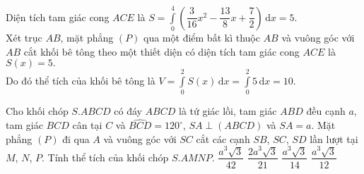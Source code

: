 \begin{ex}
{Diện tích tam giác cong $ACE$ là $S=\displaystyle\int\limits_{0}^{4}\left(\dfrac{3}{16}x^2-\dfrac{13}{8}x+\dfrac{7}{2}\right)\mathrm{\,d}x=5.$\\
Xét trục $AB$, mặt phẳng $(P)$ qua một điểm bất kì thuộc $AB$ và vuông góc với $AB$ cắt khối bê tông theo một thiết diện có diện tích tam giác cong $ACE$ là $S(x)=5.$\\
Do đó thể tích của khối bê tông là $V=\displaystyle\int\limits_{0}^{2}S(x)\mathrm{\,d}x=\displaystyle\int\limits_{0}^{2}5\mathrm{\,d}x=10.$
}
\end{ex}


\begin{ex}%
Cho khối chóp $S.ABCD$ có đáy $ABCD$ là tứ giác lồi, tam giác $ABD$ đều cạnh $a,$ tam giác $BCD$ cân tại $C$ và $\widehat{BCD}=120^\circ$, $SA\perp (ABCD)$ và $SA=a.$ Mặt phẳng $(P)$ đi qua $A$ và vuông góc với $SC$ cắt các cạnh $SB$, $SC$, $SD$ lần lượt tại $M$, $N$, $P.$ Tính thể tích của khối chóp $S.AMNP.$
\choice
{\True $\dfrac{a^3\sqrt{3}}{42}$}
{$\dfrac{2a^3\sqrt{3}}{21}$}
{$\dfrac{a^3\sqrt{3}}{14}$}
{$\dfrac{a^3\sqrt{3}}{12}$}
\end{ex}
